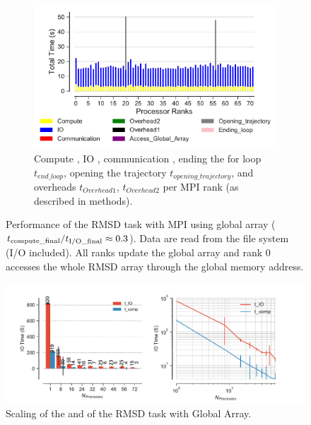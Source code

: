 \begin{figure}
\begin{subfigure} {.8\textwidth}
  \includegraphics[width=\linewidth]{figures/RMSD-ga4py-BarPlot-rank-comparison_72_1.pdf}
  \caption{Compute \tcomp, IO \tIO, communication \tcomm , ending the for loop $t_{end\_loop}$,
  opening the trajectory $t_{opening\_trajectory}$, and overheads $t_{Overhead1}$,  $t_{Overhead2}$ per MPI rank (as described in methods).}
  \label{fig:MPIranks-ga4py}
\end{subfigure}
%
\caption{Performance of the RMSD task with MPI using global array (${t}_{\text{compute\_final}}/{t}_{\text{I/O\_final}} \approx 0.3$).
Data are read from the file system (I/O included). All ranks update the global array and rank 0 accesses the whole RMSD array through the global memory address.}
\label{fig:MPIwithIO-ga4py}
\end{figure}

\begin{figure}
\centering
  \includegraphics[width=\linewidth]{figures/RMSD-ga4py-time_comp_IO_comparison.pdf}
\caption{Scaling of the \tcomp and \tIO of the RMSD task with Global Array.}
\label{fig:ScalingComputeIO-ga4py}
\end{figure}

